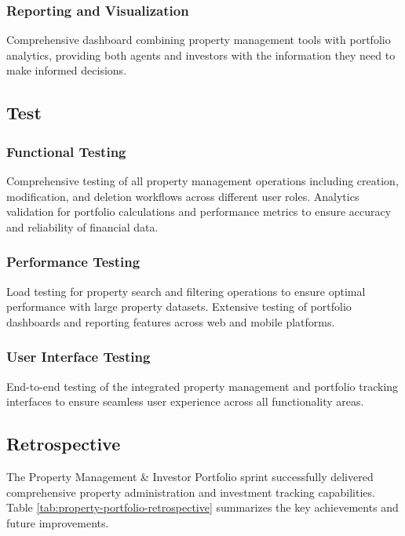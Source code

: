 \subsubsection{Reporting and Visualization}
Comprehensive dashboard combining property management tools with portfolio analytics, providing both agents and investors with the information they need to make informed decisions.

\subsection{Test}
\subsubsection{Functional Testing}
Comprehensive testing of all property management operations including creation, modification, and deletion workflows across different user roles. Analytics validation for portfolio calculations and performance metrics to ensure accuracy and reliability of financial data.

\subsubsection{Performance Testing}
Load testing for property search and filtering operations to ensure optimal performance with large property datasets. Extensive testing of portfolio dashboards and reporting features across web and mobile platforms.

\subsubsection{User Interface Testing}
End-to-end testing of the integrated property management and portfolio tracking interfaces to ensure seamless user experience across all functionality areas.

\subsection{Retrospective}

The Property Management \& Investor Portfolio sprint successfully delivered comprehensive property administration and investment tracking capabilities. Table \ref{tab:property-portfolio-retrospective} summarizes the key achievements and future improvements.

